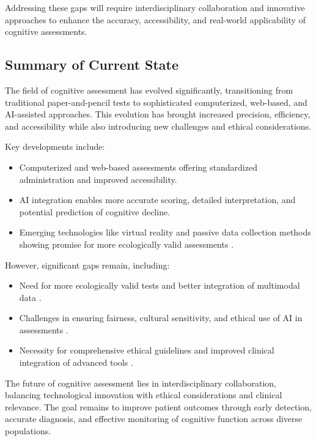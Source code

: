 Addressing these gaps will require interdisciplinary collaboration and innovative approaches to enhance the accuracy, accessibility, and real-world applicability of cognitive assessments.

\subsection{Summary of Current State}
The field of cognitive assessment has evolved significantly, transitioning from traditional paper-and-pencil tests to sophisticated computerized, web-based, and AI-assisted approaches. This evolution has brought increased precision, efficiency, and accessibility while also introducing new challenges and ethical considerations.

Key developments include:
\begin{itemize}
    \item Computerized and web-based assessments offering standardized administration and improved accessibility.
    \item AI integration enables more accurate scoring, detailed interpretation, and potential prediction of cognitive decline.
    \item Emerging technologies like virtual reality and passive data collection methods showing promise for more ecologically valid assessments \cite{Parsons2018}.
\end{itemize}

However, significant gaps remain, including:
\begin{itemize}
    \item Need for more ecologically valid tests and better integration of multimodal data \cite{Parsons2021}.
    \item Challenges in ensuring fairness, cultural sensitivity, and ethical use of AI in assessments \cite{Birhane2021}.
    \item Necessity for comprehensive ethical guidelines and improved clinical integration of advanced tools \cite{Rudin2019}.
\end{itemize}

The future of cognitive assessment lies in interdisciplinary collaboration, balancing technological innovation with ethical considerations and clinical relevance. The goal remains to improve patient outcomes through early detection, accurate diagnosis, and effective monitoring of cognitive function across diverse populations.
